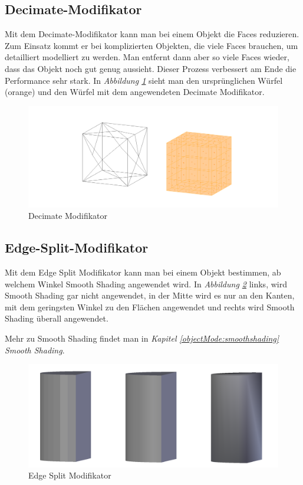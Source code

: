 \subsection{Decimate-Modifikator}\citep{blender:decimate_modifier}
\label{Decimate:heading}
Mit dem Decimate-Modifikator kann man bei einem Objekt die Faces reduzieren. Zum Einsatz kommt er bei komplizierten
Objekten, die viele Faces brauchen, um detailliert modelliert zu werden. Man entfernt dann aber so viele Faces
wieder, dass das Objekt noch gut genug aussieht. Dieser Prozess verbessert am Ende die Performance sehr stark.
In \textit{Abbildung \ref{modifikatoren:image6}} sieht man den ursprünglichen Würfel (orange) und den Würfel mit dem angewendeten
Decimate Modifikator.
\begin{figure}[h]
    \centering
    \includegraphics[width=.8\textwidth]{images/Modifikatoren-Decimate.png}
    \caption{Decimate Modifikator}
    \label{modifikatoren:image6}
\end{figure}

\subsection{Edge-Split-Modifikator}\citep{blender:edgesplit_modifier}
\label{Edge_Split:heading}
Mit dem Edge Split Modifikator kann man bei einem Objekt bestimmen, ab welchem Winkel Smooth Shading angewendet wird.
In \textit{Abbildung \ref{modifikatoren:image7}} links, wird Smooth Shading gar nicht angewendet, in der Mitte wird es nur an
den Kanten, mit dem geringsten Winkel zu den Flächen angewendet und rechts wird Smooth Shading überall angewendet.

Mehr zu Smooth Shading findet man in \textit{Kapitel \ref{objectMode:smoothshading} \dq Smooth Shading\dq}.
\begin{figure}[h]
    \centering
    \includegraphics[width=.8\textwidth]{images/Modifikatoren-Edgesplit.png}
    \caption{Edge Split Modifikator}
    \label{modifikatoren:image7}
\end{figure}